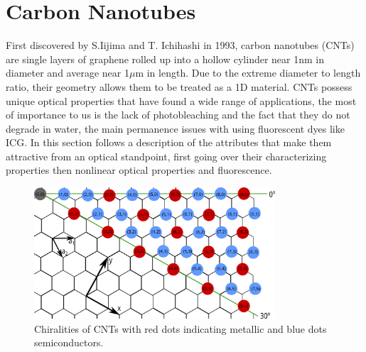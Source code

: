 \chapter{Carbon Nanotubes}
First discovered by S.Iijima and T. Ichihashi in 1993, carbon nanotubes (CNTs) are single layers of graphene rolled up into a hollow cylinder near 1nm in diameter and average near 1$\mu$m in length. Due to the extreme diameter to length ratio, their geometry allows them to be treated as a 1D material. CNTs possess unique optical properties that have found a wide range of applications\cite{yamashita}, the most of importance to us is the lack of photobleaching and the fact that they do not degrade in water, the main permanence issues with using fluorescent dyes like ICG. In this section follows a description of the attributes that make them attractive from an optical standpoint, first going over their characterizing properties then nonlinear optical properties and fluorescence.
\begin{figure}[htb!]
	\centering
	\includegraphics[width=0.8\textwidth]{./Figures/CNTs/chiral.png}
	\caption{Chiralities of CNTs with red dots indicating metallic and blue dots semiconductors. }
	\label{fig:chiralities}
\end{figure}

